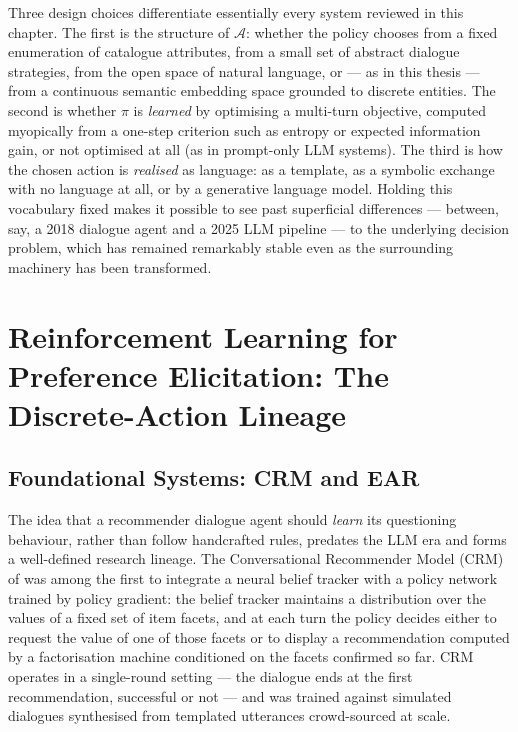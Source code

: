 Three design choices differentiate essentially every system reviewed in this chapter. The first is the structure of $\mathcal{A}$: whether the policy chooses from a fixed enumeration of catalogue attributes, from a small set of abstract dialogue strategies, from the open space of natural language, or — as in this thesis — from a continuous semantic embedding space grounded to discrete entities. The second is whether $\pi$ is \textit{learned} by optimising a multi-turn objective, computed myopically from a one-step criterion such as entropy or expected information gain, or not optimised at all (as in prompt-only LLM systems). The third is how the chosen action is \textit{realised} as language: as a template, as a symbolic exchange with no language at all, or by a generative language model. Holding this vocabulary fixed makes it possible to see past superficial differences — between, say, a 2018 dialogue agent and a 2025 LLM pipeline — to the underlying decision problem, which has remained remarkably stable even as the surrounding machinery has been transformed.

\section{Reinforcement Learning for Preference Elicitation: The Discrete-Action Lineage}
\label{sec:rl_lineage}

\subsection{Foundational Systems: CRM and EAR}

The idea that a recommender dialogue agent should \textit{learn} its questioning behaviour, rather than follow handcrafted rules, predates the LLM era and forms a well-defined research lineage. The Conversational Recommender Model (CRM) of \citet{sun2018conversational} was among the first to integrate a neural belief tracker with a policy network trained by policy gradient: the belief tracker maintains a distribution over the values of a fixed set of item facets, and at each turn the policy decides either to request the value of one of those facets or to display a recommendation computed by a factorisation machine conditioned on the facets confirmed so far. CRM operates in a single-round setting — the dialogue ends at the first recommendation, successful or not — and was trained against simulated dialogues synthesised from templated utterances crowd-sourced at scale.

